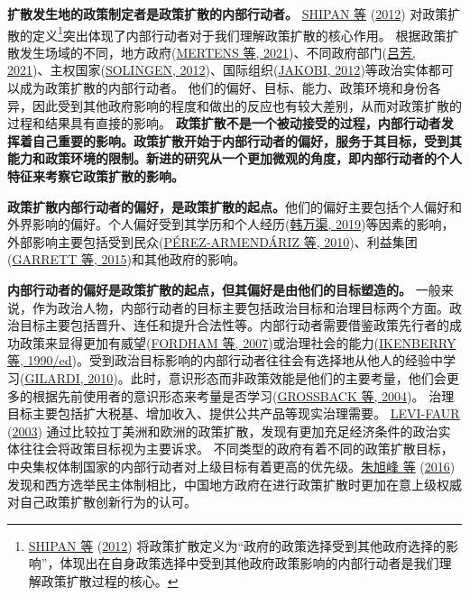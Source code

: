 \documentclass[
  12pt,
]{ctexart}
\begin{document}
\textbf{扩散发生地的政策制定者是政策扩散的内部行动者。}
\protect\hyperlink{ref-ShipanVolden2012}{SHIPAN 等} (\protect\hyperlink{ref-ShipanVolden2012}{2012}) 对政策扩散的定义\footnote{\protect\hyperlink{ref-ShipanVolden2012}{SHIPAN 等} (\protect\hyperlink{ref-ShipanVolden2012}{2012}) 将政策扩散定义为``政府的政策选择受到其他政府选择的影响''，体现出在自身政策选择中受到其他政府政策影响的内部行动者是我们理解政策扩散过程的核心。}突出体现了内部行动者对于我们理解政策扩散的核心作用。
根据政策扩散发生场域的不同，地方政府(\protect\hyperlink{ref-MertensEtAl2021}{MERTENS 等, 2021})、不同政府部门(\protect\hyperlink{ref-LuFang2021}{吕芳, 2021})、主权国家(\protect\hyperlink{ref-Solingen2012}{SOLINGEN, 2012})、国际组织(\protect\hyperlink{ref-Jakobi2012}{JAKOBI, 2012})等政治实体都可以成为政策扩散的内部行动者。
他们的偏好、目标、能力、政策环境和身份各异，因此受到其他政府影响的程度和做出的反应也有较大差别，从而对政策扩散的过程和结果具有直接的影响。
\textbf{政策扩散不是一个被动接受的过程，内部行动者发挥着自己重要的影响。政策扩散开始于内部行动者的偏好，服务于其目标，受到其能力和政策环境的限制。新进的研究从一个更加微观的角度，即内部行动者的个人特征来考察它政策扩散的影响。}

\textbf{政策扩散内部行动者的偏好，是政策扩散的起点。}他们的偏好主要包括个人偏好和外界影响的偏好。个人偏好受到其学历和个人经历(\protect\hyperlink{ref-HanWanQu2019}{韩万渠, 2019})等因素的影响，外部影响主要包括受到民众(\protect\hyperlink{ref-Perez-ArmendarizCrow2010}{PÉREZ-ARMENDÁRIZ 等, 2010})、利益集团(\protect\hyperlink{ref-GarrettJansa2015}{GARRETT 等, 2015})和其他政府的影响。

\textbf{内部行动者的偏好是政策扩散的起点，但其偏好是由他们的目标塑造的。}
一般来说，作为政治人物，内部行动者的目标主要包括政治目标和治理目标两个方面。政治目标主要包括晋升、连任和提升合法性等。内部行动者需要借鉴政策先行者的成功政策来显得更加有威望(\protect\hyperlink{ref-FordhamAsal2007}{FORDHAM 等, 2007})或治理社会的能力(\protect\hyperlink{ref-IkenberryKupchan1990}{IKENBERRY 等, 1990/ed})。受到政治目标影响的内部行动者往往会有选择地从他人的经验中学习(\protect\hyperlink{ref-Gilardi2010b}{GILARDI, 2010})。此时，意识形态而非政策效能是他们的主要考量，他们会更多的根据先前使用者的意识形态来考量是否学习(\protect\hyperlink{ref-GrossbackEtAl2004a}{GROSSBACK 等, 2004})。
治理目标主要包括扩大税基、增加收入、提供公共产品等现实治理需要。 \protect\hyperlink{ref-Levi-Faur2003}{LEVI-FAUR} (\protect\hyperlink{ref-Levi-Faur2003}{2003}) 通过比较拉丁美洲和欧洲的政策扩散，发现有更加充足经济条件的政治实体往往会将政策目标视为主要诉求。
不同类型的政府有着不同的政策扩散目标，中央集权体制国家的内部行动者对上级目标有着更高的优先级。\protect\hyperlink{ref-ZhuXuFengZhaoHui2016}{朱旭峰 等} (\protect\hyperlink{ref-ZhuXuFengZhaoHui2016}{2016}) 发现和西方选举民主体制相比，中国地方政府在进行政策扩散时更加在意上级权威对自己政策扩散创新行为的认可。
\end{document}
